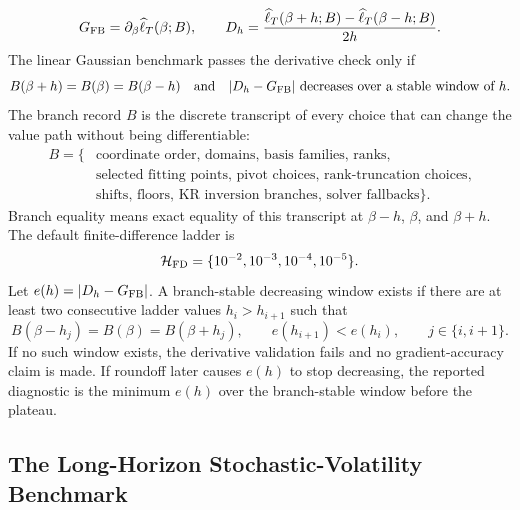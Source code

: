 \documentclass[11pt]{article}
\numberwithin{equation}{section}
\newcommand{\widehatell}{\widehat\ell}
\begin{document}
\begin{equation}
    G_{\rm FB}
    =
    \partial_\beta
    \widehatell_T(\beta;B),
    \qquad
    D_h
    =
    \frac{
    \widehatell_T(\beta+h;B)-\widehatell_T(\beta-h;B)}
    {2h}.
    \label{eq:p27-lg11}
\end{equation}
The linear Gaussian benchmark passes the derivative check only if
\begin{equation}
    B(\beta+h)=B(\beta)=B(\beta-h)
    \quad\text{and}\quad
    |D_h-G_{\rm FB}|
    \text{ decreases over a stable window of }h.
    \label{eq:p27-lg12}
\end{equation}
The branch record \(B\) is the discrete transcript of every choice that can
change the value path without being differentiable:
\begin{equation}
\begin{aligned}
    B=\{&
    \text{coordinate order, domains, basis families, ranks},\\
    &\text{selected fitting points, pivot choices, rank-truncation choices},\\
    &\text{shifts, floors, KR inversion branches, solver fallbacks}
    \}.
\end{aligned}
    \label{eq:p27-lg13}
\end{equation}
Branch equality means exact equality of this transcript at
\(\beta-h\), \(\beta\), and \(\beta+h\).  The default finite-difference ladder is
\begin{equation}
    \mathcal H_{\rm FD}
    =
    \{10^{-2},10^{-3},10^{-4},10^{-5}\}.
    \label{eq:p27-lg14}
\end{equation}
Let \(e(h)=|D_h-G_{\rm FB}|\).  A branch-stable decreasing window exists if
there are at least two consecutive ladder values \(h_i>h_{i+1}\) such that
\begin{equation}
    B(\beta-h_j)=B(\beta)=B(\beta+h_j),
    \qquad
    e(h_{i+1})<e(h_i),
    \qquad
    j\in\{i,i+1\}.
    \label{eq:p27-lg15}
\end{equation}
If no such window exists, the derivative validation fails and no
gradient-accuracy claim is made.  If roundoff later causes \(e(h)\) to stop
decreasing, the reported diagnostic is the minimum \(e(h)\) over the
branch-stable window before the plateau.

\subsection{The Long-Horizon Stochastic-Volatility Benchmark}
\end{document}
